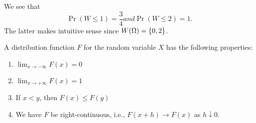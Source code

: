 We see that
\begin{subequations}
\begin{equation}
\Pr(W\leq 1)=\frac{3}{4}
\end{equation}
and
\begin{equation}
\Pr(W\leq2)=1.
\end{equation}
\end{subequations}
The latter makes intuitive sense since $W(\Omega)=\{0,2\}$. 

A distribution function $F$ for the random variable $X$ has the
following properties: 
\begin{enumerate}
\item $\displaystyle\lim_{x\to-\infty}F(x)=0$
\item $\displaystyle\lim_{x\to+\infty}F(x)=1$
\item If $x<y$, then $F(x)\leq F(y)$
\item We have $F$ be right-continuous, i.e., $F(x+h)\to F(x)$ as
  $h\downarrow 0$.
\end{enumerate}

